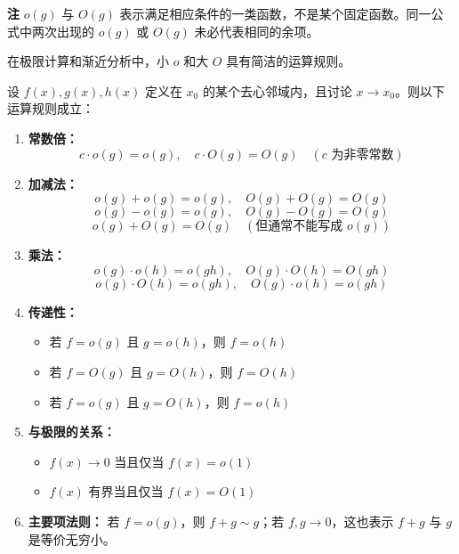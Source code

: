 \documentclass[fontset=fandol]{ctexart}
\newenvironment{remark}{\par\noindent\textbf{注}\quad}{\par\vspace{0.8em}}
\begin{document}
\begin{remark}
\(o(g)\) 与 \(O(g)\) 表示满足相应条件的一类函数，不是某个固定函数。同一公式中两次出现的 \(o(g)\) 或 \(O(g)\) 未必代表相同的余项。
\end{remark}

在极限计算和渐近分析中，小 \(o\) 和大 \(O\) 具有简洁的运算规则。

\begin{theorem}[小 \(o\) 与大 \(O\) 的运算性质]
设 \(f(x),g(x),h(x)\) 定义在 \(x_0\) 的某个去心邻域内，且讨论 \(x\to x_0\)。则以下运算规则成立：

\begin{enumerate}
\item \textbf{常数倍：}
   \[
   c \cdot o(g) = o(g),\quad c \cdot O(g) = O(g) \quad (c \text{ 为非零常数})
   \]

\item \textbf{加减法：}
   \[
   o(g) + o(g) = o(g),\quad O(g) + O(g) = O(g)
   \]
   \[
   o(g) - o(g) = o(g),\quad O(g) - O(g) = O(g)
   \]
   \[
   o(g) + O(g) = O(g) \quad (\text{但通常不能写成 } o(g))
   \]

\item \textbf{乘法：}
   \[
   o(g) \cdot o(h) = o(gh),\quad O(g) \cdot O(h) = O(gh)
   \]
   \[
   o(g) \cdot O(h) = o(gh),\quad O(g) \cdot o(h) = o(gh)
   \]

\item \textbf{传递性：}
   \begin{itemize}
   \item 若 \(f = o(g)\) 且 \(g = o(h)\)，则 \(f = o(h)\)
   \item 若 \(f = O(g)\) 且 \(g = O(h)\)，则 \(f = O(h)\)
   \item 若 \(f = o(g)\) 且 \(g = O(h)\)，则 \(f = o(h)\)
   \end{itemize}

\item \textbf{与极限的关系：}
   \begin{itemize}
   \item \(f(x) \to 0\) 当且仅当 \(f(x) = o(1)\)
   \item \(f(x)\) 有界当且仅当 \(f(x) = O(1)\)
   \end{itemize}

\item \textbf{主要项法则：} 若 \(f=o(g)\)，则 \(f+g\sim g\)；若 \(f,g\to0\)，这也表示 \(f+g\) 与 \(g\) 是等价无穷小。
\end{enumerate}
\end{theorem}
\end{document}
